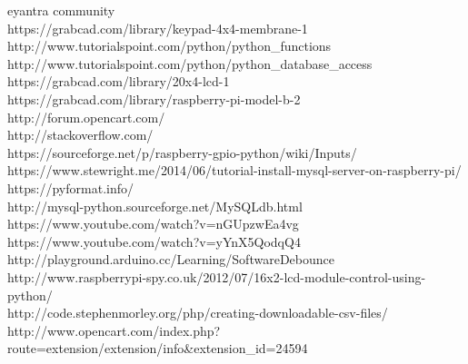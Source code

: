 \documentclass[a4paper,12pt,oneside]{book}
\begin{document}
\begin{thebibliography}{li}
 eyantra community\\
 https://grabcad.com/library/keypad-4x4-membrane-1\\
 http://www.tutorialspoint.com/python/python\_functions\\
 http://www.tutorialspoint.com/python/python\_database\_access\\
 https://grabcad.com/library/20x4-lcd-1\\
 https://grabcad.com/library/raspberry-pi-model-b-2\\
 http://forum.opencart.com/\\
 http://stackoverflow.com/\\
 https://sourceforge.net/p/raspberry-gpio-python/wiki/Inputs/\\
 https://www.stewright.me/2014/06/tutorial-install-mysql-server-on-raspberry-pi/\\
 https://pyformat.info/\\
 http://mysql-python.sourceforge.net/MySQLdb.html\\
 https://www.youtube.com/watch?v=nGUpzwEa4vg\\
 https://www.youtube.com/watch?v=yYnX5QodqQ4\\
 http://playground.arduino.cc/Learning/SoftwareDebounce\\
 http://www.raspberrypi-spy.co.uk/2012/07/16x2-lcd-module-control-using-python/\\
 http://code.stephenmorley.org/php/creating-downloadable-csv-files/\\
 http://www.opencart.com/index.php?route=extension/extension/info\&extension\_id=24594\\
\end{thebibliography}
\end{document}
